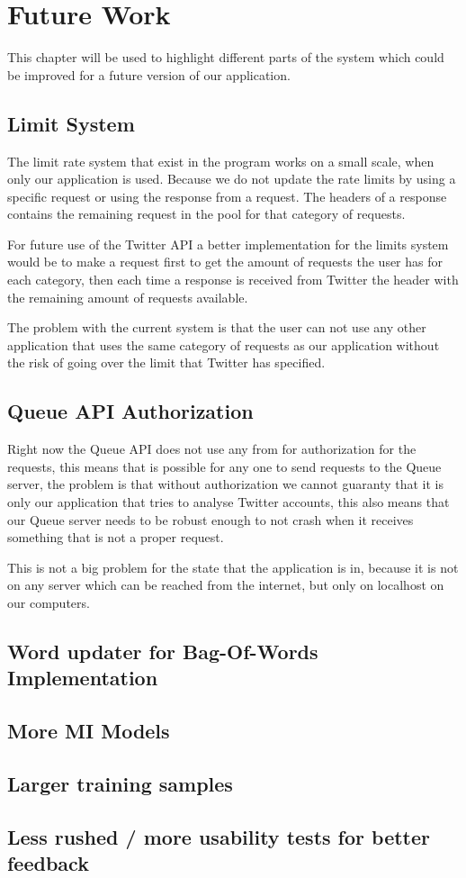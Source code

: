 \chapter{Future Work}\label{fwork}
This chapter will be used to highlight different parts of the system which could
be improved for a future version of our application.

\section{Limit System}
The limit rate system that exist in the program works on a small scale, when
only our application is used. Because we do not update the rate limits by
using a specific request or using the response from a
request.
The headers of a response contains the remaining request in the pool for that
category of requests. \nl

For future use of the Twitter \ac{API} a better implementation for the limits
system would be to make a request first to get the amount of requests the user
has for each category, then each time a response is received from Twitter the
header with the remaining amount of requests available. \nl

The problem with the current system is that the user can not use any other
application that uses the same category of requests as our application without
the risk of going over the limit that Twitter has specified.

\section{Queue API Authorization}
Right now the Queue API does not use any from for authorization for the
requests, this means that is possible for any one to send requests to the
Queue server, the problem is that without authorization we cannot guaranty that
it is only our application that tries to analyse Twitter accounts, this also
means that our Queue server needs to be robust enough to not crash when it
receives something that is not a proper request. \nl

This is not a big problem for the state that the application is in, because it
is not on any server which can be reached from the internet, but only on
localhost on our computers. 

\section{Word updater for Bag-Of-Words Implementation}

\section{More MI  Models}

\section{Larger training samples}

\section{Less rushed / more usability tests for better feedback}
